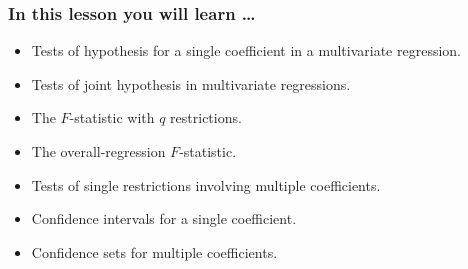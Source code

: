 

\begin{frame}
\frametitle{In this lesson you will learn \dots}
\begin{itemize}
\item Tests of hypothesis for a single coefficient in a multivariate regression.
\item Tests of joint hypothesis in multivariate regressions.
\item The $F$-statistic with $q$ restrictions.
\item The overall-regression $F$-statistic.
\item Tests of single restrictions involving multiple coefficients.
\item Confidence intervals for a single coefficient.
\item Confidence sets for multiple coefficients. 
\end{itemize}
\end{frame}


